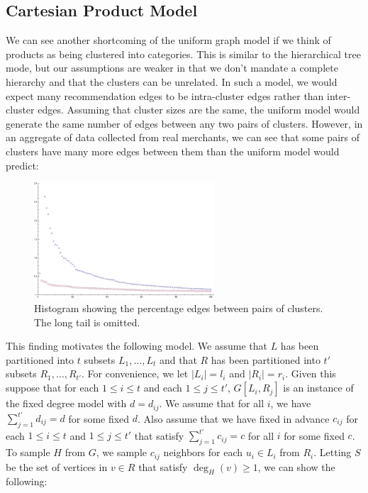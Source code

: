\subsection{Cartesian Product Model}
\label{cartesian}
We can see another shortcoming of the uniform graph model if we think
of products as being clustered into categories. This is similar to the
hierarchical tree mode, but our assumptions are weaker in that we don't
mandate a complete hierarchy and that the clusters can be unrelated. In
such a model, we would expect many recommendation edges to be 
intra-cluster edges rather than inter-cluster edges. Assuming that
cluster sizes are the same, the uniform model would generate the same
number of edges between any two pairs of clusters. However, in an 
aggregate of data collected from real merchants, we can see that some
pairs of clusters have many more edges between them than the uniform
model would predict:

\begin{figure}[h]
\centering
\includegraphics[width=0.6\textwidth]{images/cartesian_histogram.png}
\begin{minipage}[h]{0.7\textwidth}
\caption{Histogram showing the percentage edges between pairs of clusters. The long tail is omitted.}
\end{minipage}
\end{figure}

This finding motivates the following model. We assume that
$L$ has been partitioned into $t$ subsets $L_1,\ldots, L_t$ and
that $R$ has been partitioned into $t'$ subsets $R_1,\ldots,
R_{t'}$. For convenience, we let $|L_i| = l_i$ and $|R_i|=r_i$. Given
this suppose that for each $1\leq i\leq t$ and each $1\leq j\leq t'$,
$G[L_i, R_j]$ is an instance of the fixed degree model with
$d=d_{ij}$. We assume that for all $i$, we have $\sum_{j=1}^{t'}
d_{ij} = d$ for some fixed $d$. Also assume that we have fixed in
advance $c_{ij}$ for each $1\leq i\leq t$ and $1\leq j\leq t'$ that
satisfy $\sum_{j=1}^{t'} c_{ij} = c$ for all $i$ for some fixed $c$.
To sample $H$ from $G$, we sample $c_{ij}$ neighbors for each 
$u_i\in L_i$ from $R_i$. Letting $S$ be the set of vertices in 
$v\in R$ that satisfy $\deg_H(v)\geq 1$, we can show the following:

